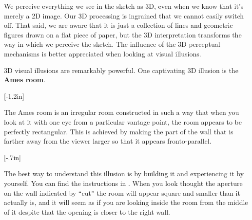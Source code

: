We  perceive everything we see in the sketch as 3D, even when we know that it's merely a 2D image. Our 3D processing is ingrained that we cannot easily switch off. That said, we are aware that it is just a collection of lines and geometric figures drawn on a flat piece of paper, but the 3D interpretation transforms the way in which we perceive the sketch. The influence of the 3D perceptual mechanisms is better appreciated when looking at visual illusions. 


3D visual illusions are remarkably powerful. One captivating 3D illusion is the {\bf Ames room}.

[-1.2in]

The Ames room is an irregular room constructed in such a way that when you look at it with one eye from a particular vantage point, the room appears to be perfectly rectangular. This is achieved by making the part of the wall that is farther away from the viewer larger so that it appears fronto-parallel. 


[-.7in]

The best way to understand this illusion is by building it and experiencing it by yourself. You can find the instructions in \fig{\ref{fig:ames_room}}. When you look thought the aperture on the wall indicated by ``cut'' the room will appear square and smaller than it actually is, and it will seem as if you are looking inside the room from the middle of it despite that the opening is closer to the right wall. 


